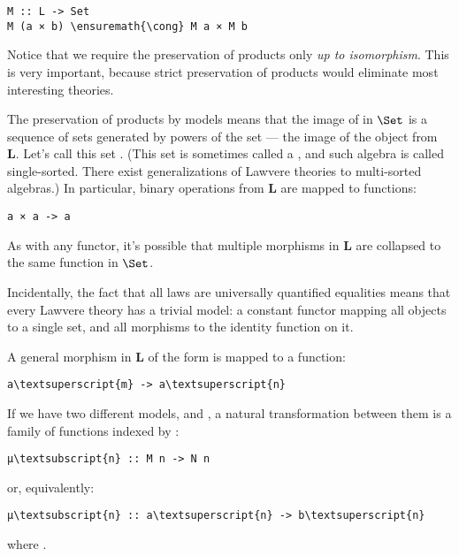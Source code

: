 \begin{Verbatim}[commandchars=\\\{\}]
M :: L -> Set
M (a × b) \ensuremath{\cong} M a × M b
\end{Verbatim}
Notice that we require the preservation of products only \emph{up to
isomorphism}. This is very important, because strict preservation of
products would eliminate most interesting theories.

The preservation of products by models means that the image of
 in $\Set$ is a sequence of sets generated by powers of
the set  --- the image of the object  from
\textbf{L}. Let's call this set . (This set is sometimes
called a , and such algebra is called single-sorted. There
exist generalizations of Lawvere theories to multi-sorted algebras.) In
particular, binary operations from \textbf{L} are mapped to functions:

\begin{Verbatim}[commandchars=\\\{\}]
a × a -> a
\end{Verbatim}
As with any functor, it's possible that multiple morphisms in \textbf{L}
are collapsed to the same function in $\Set$.

Incidentally, the fact that all laws are universally quantified
equalities means that every Lawvere theory has a trivial model: a
constant functor mapping all objects to a single set, and all morphisms
to the identity function on it.

A general morphism in \textbf{L} of the form
 is mapped to a function:

\begin{Verbatim}[commandchars=\\\{\}]
a\textsuperscript{m} -> a\textsuperscript{n}
\end{Verbatim}
If we have two different models,  and , a natural
transformation between them is a family of functions indexed by
:

\begin{Verbatim}[commandchars=\\\{\}]
μ\textsubscript{n} :: M n -> N n
\end{Verbatim}
or, equivalently:

\begin{Verbatim}[commandchars=\\\{\}]
μ\textsubscript{n} :: a\textsuperscript{n} -> b\textsuperscript{n}
\end{Verbatim}
where .

